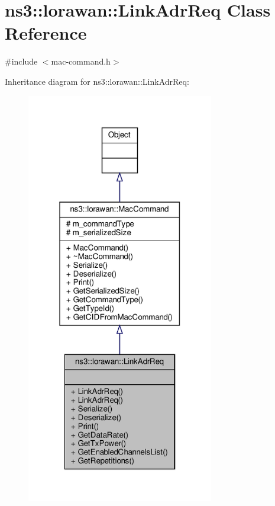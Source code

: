 \hypertarget{classns3_1_1lorawan_1_1LinkAdrReq}{}\section{ns3\+:\+:lorawan\+:\+:Link\+Adr\+Req Class Reference}
\label{classns3_1_1lorawan_1_1LinkAdrReq}


{\ttfamily \#include $<$mac-\/command.\+h$>$}



Inheritance diagram for ns3\+:\+:lorawan\+:\+:Link\+Adr\+Req\+:
\nopagebreak
\begin{figure}[H]
\begin{center}
\leavevmode
\includegraphics[width=232pt]{classns3_1_1lorawan_1_1LinkAdrReq__inherit__graph}
\end{center}
\end{figure}


